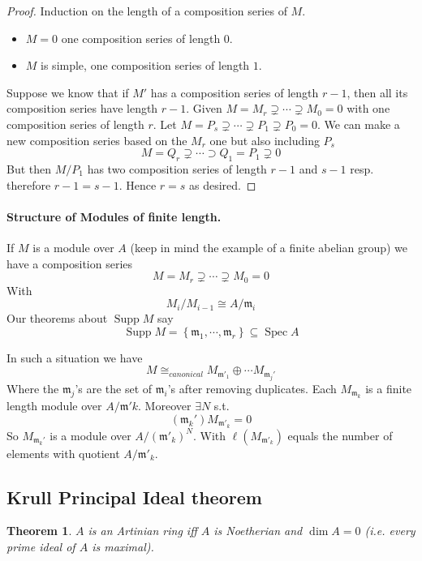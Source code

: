 \documentclass[11pt,a4paper]{article}
\theoremstyle{definition}
\theoremstyle{plain}
\newtheorem{theorem}[definition]{Theorem}
\theoremstyle{remark}
\renewcommand{\set}[1]{\left\{ #1 \right\}}
\newcommand{\Spec}{\operatorname{Spec}}
\newcommand{\Supp}{\operatorname{Supp}}
\begin{document}
\begin{proof}
    Induction on the length of a composition series of $M$. 
    \begin{itemize}
        \item $M = 0$ one composition series of length $0$. 
        \item $M$ is simple, one composition series of length $1$. 
    \end{itemize}
    Suppose we know that if $M'$ has a composition series of length $r-1$, then all its composition series have length $r-1$. 
    Given $M = M_r \supsetneq \cdots \supsetneq M_0 = 0$ with one composition series of length $r$. Let 
    $M = P_s \supsetneq \cdots \supsetneq P_1 \supsetneq P_0 = 0$. We can make a new composition series based on the $M_r$ one 
    but also including $P_s$
    $$M = Q_r \supsetneq \cdots \supset Q_1 = P_1 \supsetneq 0$$
    But then $M/P_1$ has two composition series of length $r-1$ and $s-1$ resp. therefore 
    $r-1 = s-1$. Hence $r=s$ as desired.
\end{proof}

\paragraph{Structure of Modules of finite length.} 
If $M$ is a module over $A$ (keep in mind the example of a finite abelian group) we have a composition series 
$$M= M_r \supsetneq \cdots \supsetneq M_0 = 0$$
With 
$$M_i / M_{i-1} \cong A / \mathfrak{m}_i$$
Our theorems about $\Supp M$ say 
$$\Supp M = \set{\mathfrak{m}_1, \cdots, \mathfrak{m}_r} \subseteq \Spec A$$

In such a situation we have 
$$M \cong_{canonical} M_{\mathfrak{m}'_1} \oplus \cdots M_{\mathfrak{m}_j'}$$
Where the $\mathfrak{m}_j$'s are the set of $\mathfrak{m}_i$'s after removing duplicates. 
Each $M_{\mathfrak{m}_k}$ is a finite length module over $A/\mathfrak{m}'k$. Moreover $\exists N$ s.t. 
$$(\mathfrak{m}_k')M_{\mathfrak{m}'_k} = 0$$ 
So $M_{\mathfrak{m}_k'}$ is a module over $A/(\mathfrak{m}'_k)^N$. 
With $\ell(M_{\mathfrak{m}'_k})$ equals the number of elements with quotient $A/\mathfrak{m}'_k$.

\subsection{Krull Principal Ideal theorem}
\begin{theorem}
    $A$ is an Artinian ring iff $A$ is Noetherian and $\dim A = 0$ (i.e. every prime 
    ideal of $A$ is maximal).
\end{theorem}
\end{document}
